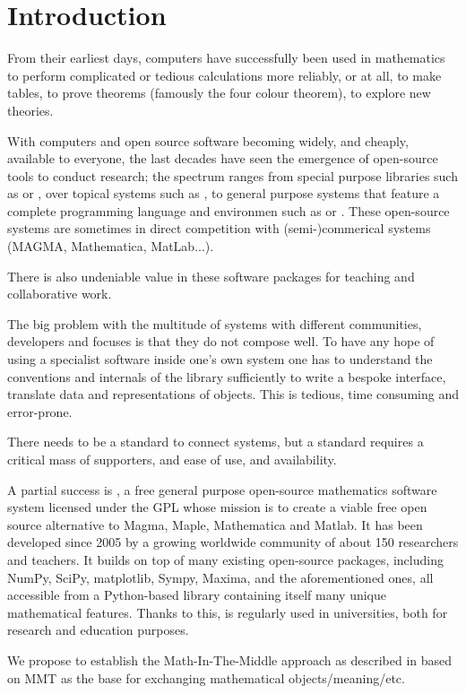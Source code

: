 \section{Introduction}

From their earliest days, computers have successfully been used in mathematics
to perform complicated or tedious calculations more reliably, or at all, to make
tables, to prove theorems (famously the four colour theorem), to explore new
theories.

With computers and open source software becoming widely, and cheaply, available
to everyone, the last decades have seen the emergence of open-source tools to
conduct research; the spectrum ranges from special purpose libraries such as
\MPIR or \Linbox, over topical systems such as \Singular, to general purpose
systems that feature a complete programming language and environmen such as
\GAP or \Sage.
These open-source systems are sometimes in direct competition with
(semi-)commerical systems (MAGMA, Mathematica, MatLab...).

There is also undeniable value in these software packages for teaching and
collaborative work.

The big problem with the multitude of systems with different communities,
developers and focuses is that they do not compose well. To have any hope of
using a specialist software inside one's own system one has to understand the
conventions and internals of the library sufficiently to write a bespoke
interface, translate data and representations of objects. This is tedious, time
consuming and error-prone.

There needs to be a standard to connect systems, but a standard requires a
critical mass of supporters, and ease of use, and availability.


A partial success is \Sage, a free general purpose open-source mathematics
software system licensed under the GPL whose mission is to create a
viable free open source alternative to Magma, Maple, Mathematica and
Matlab. It has been developed since 2005 by a growing worldwide community of
about 150 researchers and teachers. It builds on top of many existing
open-source packages, including NumPy, SciPy, matplotlib, Sympy,
Maxima, and the aforementioned ones, all accessible from a
Python-based library containing itself many unique mathematical
features.
Thanks to this, \Sage is regularly used in universities, both for
research and education purposes.

We propose to establish the Math-In-The-Middle approach as described in
 based on MMT as the base for exchanging mathematical
objects/meaning/etc.

